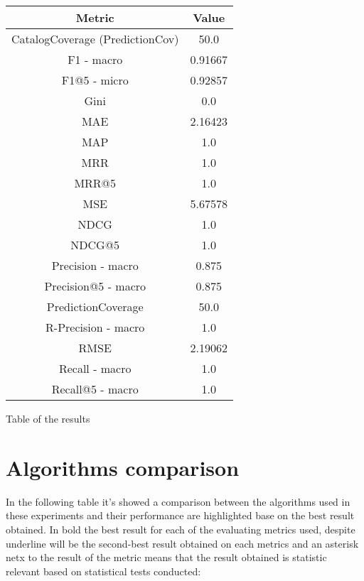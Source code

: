 \documentclass[11pt]{article}
\begin{document}
\begin{center}
    \begin{tabular}{|c|c|}
        \hline
        \textbf{Metric} & \textbf{Value} \\ \hline
                CatalogCoverage (PredictionCov) & 50.0 \\ \hline
                F1 - macro & 0.91667 \\ \hline
                F1@5 - micro & 0.92857 \\ \hline
                Gini & 0.0 \\ \hline
                MAE & 2.16423 \\ \hline
                MAP & 1.0 \\ \hline
                MRR & 1.0 \\ \hline
                MRR@5 & 1.0 \\ \hline
                MSE & 5.67578 \\ \hline
                NDCG & 1.0 \\ \hline
                NDCG@5 & 1.0 \\ \hline
                Precision - macro & 0.875 \\ \hline
                Precision@5 - macro & 0.875 \\ \hline
                PredictionCoverage & 50.0 \\ \hline
                R-Precision - macro & 1.0 \\ \hline
                RMSE & 2.19062 \\ \hline
                Recall - macro & 1.0 \\ \hline
                Recall@5 - macro & 1.0 \\ \hline
             \end{tabular}
    \captionsetup{type=table}
    \caption{Table of the results}
    \label{tab:results_table_AmarDoubleSource}
\end{center}
\hfill\break
\hfill\break



\section{Algorithms comparison}\label{sec:comparison}
In the following table it's showed a comparison between the algorithms used in these experiments
and their performance are highlighted base on the best result obtained.
In bold the best result for each of the evaluating metrics used, despite underline will be the second-best result
obtained on each metrics and an asterisk netx to the result of the metric means that the result obtained is statistic
relevant based on statistical tests conducted:
\end{document}
